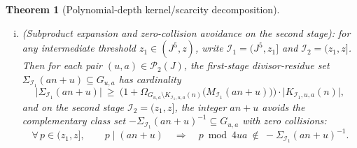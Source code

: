 \documentclass[11pt, a4paper]{article}
\theoremstyle{plain}
\newtheorem{theorem}{Theorem}[section]
\theoremstyle{definition}
\begin{document}
\begin{theorem}[Polynomial-depth kernel/scarcity decomposition]
\begin{enumerate}[(a)]
\begin{enumerate}[(i)]
        \begin{equation}\label{eq:scarcity_overload}
        \sum_{(u,a)\in\mathcal{P}_2(J)}\Omega_{G_{u,a}\setminus K_{\mathcal{I},u,a}(n)}\big(M_{\mathcal{I}}(an+u)\big)\ >\ R_0(\lambda,N)\asymp(\log N)^{2\lambda}\log\log N;
        \end{equation}
        \item \emph{(Subproduct expansion and zero-collision avoidance on the second stage):} for any intermediate threshold $z_1\in(J^{5},z)$, write $\mathcal{I}_1=(J^{5},z_1]$ and $\mathcal{I}_2=(z_1,z]$. Then for each pair $(u,a)\in\mathcal{P}_2(J)$, the first-stage divisor-residue set $\Sigma_{\mathcal{I}_1}(an+u)\subseteq G_{u,a}$ has cardinality
        \begin{equation}\label{eq:sigma1_growth}
        \big|\Sigma_{\mathcal{I}_1}(an+u)\big|\ \ge\ \Big(1+\Omega_{G_{u,a}\setminus K_{\mathcal{I}_1,u,a}(n)}\big(M_{\mathcal{I}_1}(an+u)\big)\Big)\cdot\big|K_{\mathcal{I}_1,u,a}(n)\big|,
        \end{equation}
        and on the second stage $\mathcal{I}_2=(z_1,z]$, the integer $an+u$ avoids the complementary class set $-\Sigma_{\mathcal{I}_1}(an+u)^{-1}\subseteq G_{u,a}$ with zero collisions:
        \begin{equation}\label{eq:zero_collision_second_stage}
        \forall\,p\in(z_1,z],\qquad p\mid(an+u)\quad\Longrightarrow\quad p\bmod 4ua\ \notin\ -\Sigma_{\mathcal{I}_1}(an+u)^{-1}.
        \end{equation}
    \end{enumerate}
\end{enumerate}
\end{theorem}
\end{document}
